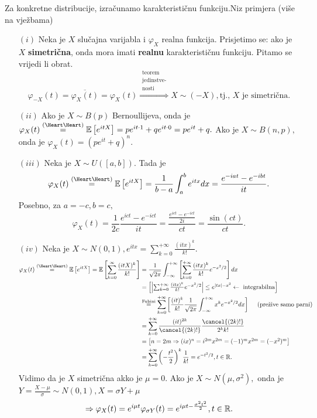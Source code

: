\documentclass{article}
\begin{document}
Za konkretne distribucije, izračunamo karakterističnu funkciju.\newline Niz primjera (više na vježbama)
\begin{enumerate}
    \item[\((i)\)] Neka je \(X\) slučajna varijabla i \(\varphi_X\) realna funkcija. Prisjetimo se: ako je \(X\) \textbf{simetrična}, onda mora imati \textbf{realnu} karakterističnu funkciju. Pitamo se vrijedi li obrat. \[\varphi_{-X}(t)=\overline{\varphi_X(t)}=\varphi_X(t)\overset{\substack{\text{teorem}\\\text{jedinstve-}\\\text{nosti}}}{\Rightarrow}X\sim(-X),\text{tj., }X\text{ je simetrična.}\] \item[\((ii)\)] Ako je \(X\sim B(p)\) Bernoullijeva, onda je \(\varphi_X(t)\overset{\text{(\Heart\Heart)}}{=}\Bbb E\left[e^{itX}\right]=pe^{it\cdot 1}+qe^{it\cdot 0}=pe^{it}+q.\) Ako je \(X\sim B(n,p),\) onda je \(\varphi_X(t)=\left(pe^{it}+q\right)^n.\)
    \item[\((iii)\)] Neka je \(X\sim U\left([a,b]\right).\) Tada je \[\varphi_X(t)\overset{\text{(\Heart\Heart)}}{=}\Bbb E\left[e^{itX}\right]=\frac1{b-a}\int_a^be^{itx}dx=\frac{e^{-iat}-e^{-ibt}}{it}.\] Posebno, za \(a=-c, b=c,\) \[\varphi_X(t)=\frac1{2c}\frac{e^{ict}-e^{-ict}}{it}=\frac{\frac{e^{ict}-e^{-ict}}{2i}}{ct}=\frac{\sin(ct)}{ct}.\]
    \item[\((iv)\)] Neka je \(X\sim N(0,1),\displaystyle e^{itx}=\sum_{k=0}^{+\infty}\frac{(itx)^k}{k!}.\) \[\begin{aligned}\varphi_X(t)\overset{\text{(\Heart\Heart)}}{=}\Bbb E\left[e^{itX}\right]=\Bbb E\left[\sum_{k=0}^{\infty}\frac{(itX)^k}{k!}\right]&=\frac1{\sqrt{2\pi}}\int_{-\infty}^{+\infty}\left[\sum_{k=0}^{+\infty}\frac{(itx)^k}{k!}e^{-x^2/2}\right]dx\\&=\begin{bmatrix}\left|\sum_{k=0}^{+\infty}\frac{(itx)^k}{k!}e^{-x^2/2}\right|\le e^{|tx|-x^2}\leftarrow\text{ integrabilna}\end{bmatrix}\\&\overset{\text{Fubini}}{=}\sum_{k=0}^{+\infty}\left[\frac{(it)^k}{k!}\frac1{\sqrt{2\pi}}\int_{-\infty}^{+\infty}x^ke^{-x^2/2}dx\right]\quad\text{ (prežive samo parni})\\&=\sum_{k=0}^{+\infty}\frac{(it)^{2k}}{\cancel{(2k)!}}\frac{\cancel{(2k)!}}{2^kk!}\\&=\begin{bmatrix}n=2m\Rightarrow (ix)^n=i^{2m}x^{2m}=(-1)^mx^{2m}=(-x^2)^m\end{bmatrix}\\&=\sum_{k=0}^{+\infty}\left(-\frac{t^2}2\right)^k\frac1{k!}=e^{-t^2/2},t\in\Bbb R.\end{aligned}\] Vidimo da je \(X\) simetrična akko je \(\mu=0.\) Ako je \(X\sim N(\mu,\sigma^2),\) onda je \(Y=\frac{X-\mu}\sigma\sim N(0,1), X=\sigma Y+\mu\) \[\Rightarrow\varphi_X(t)=e^{i\mu t}\varphi_{\sigma Y}(t)=e^{i\mu t-\frac{\sigma^2t^2}2},t\in\Bbb R.\] 

\end{enumerate}
\end{document}
